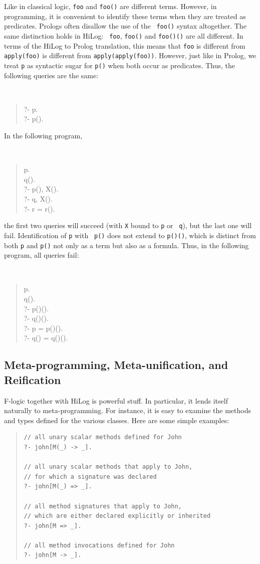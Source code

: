 \documentclass[11pt]{article}
\newcommand{\fl}{\mbox{F-logic}\xspace}
\begin{document}
%
Like in classical logic, {\tt foo} and {\tt foo()} are different terms.
However, in programming, it is convenient to identify these terms when they
are treated as predicates. Prologs often disallow the use of the {\tt
  foo()} syntax altogether.  The same distinction holds in HiLog: {\tt
  foo}, {\tt foo()} and {\tt foo()()} are all different. In terms of the
HiLog to Prolog translation, this means that {\tt foo} is different from
{\tt apply(foo)} is different from {\tt apply(apply(foo))}.  However, just
like in Prolog, we treat {\tt p} as syntactic sugar for {\tt p()} when both
occur as predicates. Thus, the following queries are the same:
{\tt
\begin{quote}
   ?- p.\\
   ?- p().
\end{quote}
}
\noindent
In the following program,
{\tt
\begin{quote}
 p. \\
 q().\\
 ?- p(), X().\\
 ?- q, X().\\
 ?- r = r().
\end{quote}
}
\noindent
the first two queries will succeed (with {\tt X} bound to {\tt p} or {\tt
  q}), but the last one will fail.  Identification of {\tt p} with {\tt
  p()} does not extend to {\tt p()()}, which is distinct from both {\tt p}
and {\tt p()} not only as a term but also as a formula. Thus, in the following
program, all queries fail:
{\tt
\begin{quote}
 p.\\
 q().\\
 ?- p()().\\
 ?- q()().\\
 ?- p = p()().\\
 ?- q() = q()().
\end{quote}
}


\subsection{Meta-programming, Meta-unification, and Reification}
\label{sec-meta-reification}


%
\fl together with HiLog is powerful stuff. In particular, it lends itself
naturally to meta-programming. For instance, it is easy to examine the
methods and types defined for the various classes.  Here are some simple
examples:
\begin{quote}
\begin{verbatim}
// all unary scalar methods defined for John
?- john[M(_) -> _].

// all unary scalar methods that apply to John,
// for which a signature was declared
?- john[M(_) => _].

// all method signatures that apply to John,
// which are either declared explicitly or inherited
?- john[M => _].

// all method invocations defined for John
?- john[M -> _].
\end{verbatim}
\end{quote}
\end{document}
